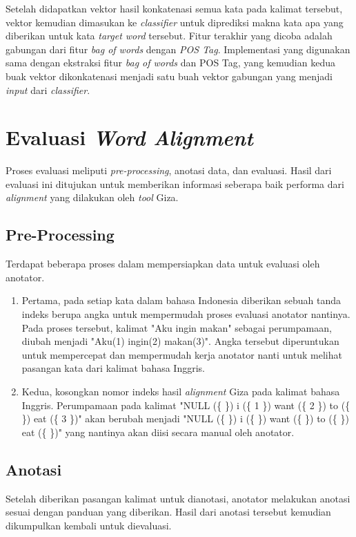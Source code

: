 Setelah didapatkan vektor hasil konkatenasi semua kata pada kalimat tersebut, vektor kemudian dimasukan ke \textit{classifier} untuk diprediksi makna kata apa yang diberikan untuk kata \textit{target word} tersebut.
Fitur terakhir yang dicoba adalah gabungan dari fitur \textit{bag of words} dengan \textit{POS Tag}. Implementasi yang digunakan sama dengan ekstraksi fitur \textit{bag of words} dan POS Tag, yang kemudian kedua buak vektor dikonkatenasi menjadi satu buah vektor gabungan yang menjadi \textit{input} dari \textit{classifier}.

\section{Evaluasi \textit{Word Alignment}}

Proses evaluasi meliputi \textit{pre-processing}, anotasi data, dan evaluasi. Hasil dari evaluasi ini ditujukan untuk memberikan informasi seberapa baik performa dari \textit{alignment} yang dilakukan oleh \textit{tool} Giza.

\subsection{Pre-Processing}
Terdapat beberapa proses dalam mempersiapkan data untuk evaluasi oleh anotator.
\begin{enumerate}
	\item Pertama, pada setiap kata dalam bahasa Indonesia diberikan sebuah tanda indeks berupa angka untuk mempermudah proses evaluasi anotator nantinya. Pada proses tersebut, kalimat "Aku ingin makan" sebagai perumpamaan, diubah menjadi "Aku(1) ingin(2) makan(3)". Angka tersebut diperuntukan untuk mempercepat dan mempermudah kerja anotator nanti untuk melihat pasangan kata dari kalimat bahasa Inggris.
	\item Kedua, kosongkan nomor indeks hasil \textit{alignment} Giza pada kalimat bahasa Inggris. Perumpamaan pada kalimat "NULL (\{  \}) i (\{ 1 \}) want (\{ 2 \}) to (\{  \}) eat (\{ 3 \})" akan berubah menjadi  "NULL (\{  \}) i (\{  \}) want (\{   \}) to (\{  \}) eat (\{  \})" yang nantinya akan diisi secara manual oleh anotator.
\end{enumerate}

\subsection{Anotasi}
Setelah diberikan pasangan kalimat untuk dianotasi, anotator melakukan anotasi sesuai dengan panduan yang diberikan. Hasil dari anotasi tersebut kemudian dikumpulkan kembali untuk dievaluasi.

